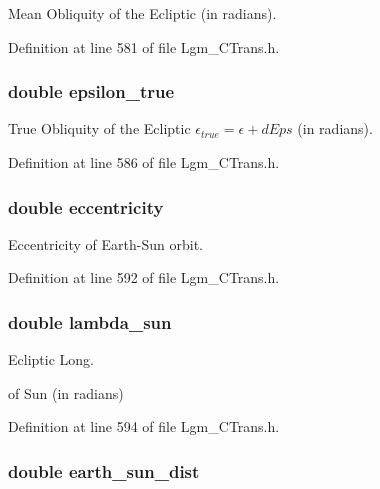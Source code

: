 Mean Obliquity of the Ecliptic (in radians). 



Definition at line 581 of file Lgm\_\-CTrans.h.\hypertarget{struct_lgm___c_trans_a8bf1178f8d7700b7ba6752dd3a0fe0d}{
\subsubsection[{epsilon\_\-true}]{\setlength{\rightskip}{0pt plus 5cm}double {\bf epsilon\_\-true}}}
\label{struct_lgm___c_trans_a8bf1178f8d7700b7ba6752dd3a0fe0d}


True Obliquity of the Ecliptic $\epsilon_{true} = \epsilon + dEps$ (in radians). 



Definition at line 586 of file Lgm\_\-CTrans.h.\hypertarget{struct_lgm___c_trans_4daf524c969da993dc09f2b3c8d56173}{
\subsubsection[{eccentricity}]{\setlength{\rightskip}{0pt plus 5cm}double {\bf eccentricity}}}
\label{struct_lgm___c_trans_4daf524c969da993dc09f2b3c8d56173}


Eccentricity of Earth-Sun orbit. 



Definition at line 592 of file Lgm\_\-CTrans.h.\hypertarget{struct_lgm___c_trans_bfeab9ab1ea1f52c6b33a0794809d62a}{
\subsubsection[{lambda\_\-sun}]{\setlength{\rightskip}{0pt plus 5cm}double {\bf lambda\_\-sun}}}
\label{struct_lgm___c_trans_bfeab9ab1ea1f52c6b33a0794809d62a}


Ecliptic Long. 

of Sun (in radians) 

Definition at line 594 of file Lgm\_\-CTrans.h.\hypertarget{struct_lgm___c_trans_25ad562558907e5ad4aad47740092522}{
\subsubsection[{earth\_\-sun\_\-dist}]{\setlength{\rightskip}{0pt plus 5cm}double {\bf earth\_\-sun\_\-dist}}}
\label{struct_lgm___c_trans_25ad562558907e5ad4aad47740092522}


